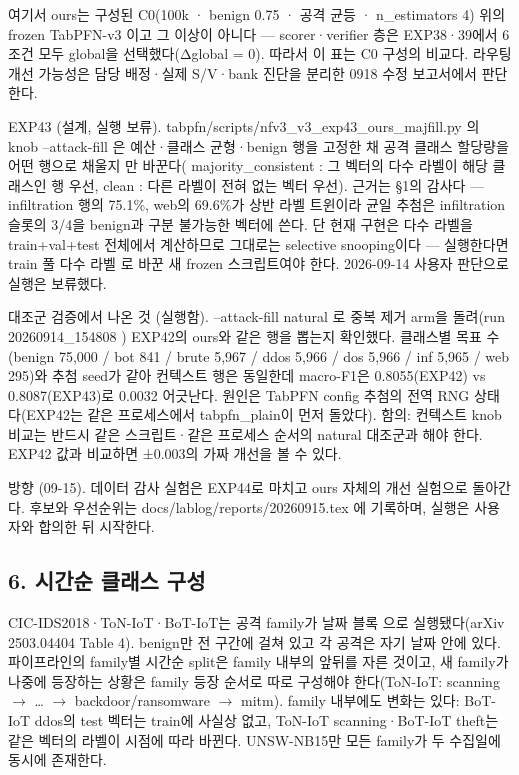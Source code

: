 여기서 ours는 구성된 C0(100k · benign 0.75 · 공격 균등 · n\_\allowbreak{}estimators 4) 위의 frozen TabPFN-v3 이고 그 이상이 아니다 — scorer·verifier 층은 EXP38·39에서 6조건 모두 global을 선택했다(Δglobal =\allowbreak{} 0). 따라서 이 표는 C0 구성의 비교다. 라우팅 개선 가능성은 담당 배정·실제 S/\allowbreak{}V·bank 진단을 분리한 0918 수정 보고서에서 판단한다.

EXP43 (설계, 실행 보류). tabpfn/\allowbreak{}scripts/\allowbreak{}nfv3\_\allowbreak{}v3\_\allowbreak{}exp43\_\allowbreak{}ours\_\allowbreak{}majfill.py 의 knob --attack-fill 은 예산·클래스 균형·benign 행을 고정한 채 공격 클래스 할당량을 어떤 행으로 채울지 만 바꾼다( majority\_\allowbreak{}consistent : 그 벡터의 다수 라벨이 해당 클래스인 행 우선, clean : 다른 라벨이 전혀 없는 벡터 우선). 근거는 §1의 감사다 — infiltration 행의 75.1\%, web의 69.6\%가 상반 라벨 트윈이라 균일 추첨은 infiltration 슬롯의 3/\allowbreak{}4을 benign과 구분 불가능한 벡터에 쓴다. 단 현재 구현은 다수 라벨을 train+\allowbreak{}val+\allowbreak{}test 전체에서 계산하므로 그대로는 selective snooping이다 — 실행한다면 train 풀 다수 라벨 로 바꾼 새 frozen 스크립트여야 한다. 2026-09-14 사용자 판단으로 실행은 보류했다.

대조군 검증에서 나온 것 (실행함). --attack-fill natural 로 중복 제거 arm을 돌려(run 20260914\_\allowbreak{}154808 ) EXP42의 ours와 같은 행을 뽑는지 확인했다. 클래스별 목표 수(benign 75,000 /\allowbreak{} bot 841 /\allowbreak{} brute 5,967 /\allowbreak{} ddos 5,966 /\allowbreak{} dos 5,966 /\allowbreak{} inf 5,965 /\allowbreak{} web 295)와 추첨 seed가 같아 컨텍스트 행은 동일한데 macro-F1은 0.8055(EXP42) vs 0.8087(EXP43)로 0.0032 어긋난다. 원인은 TabPFN config 추첨의 전역 RNG 상태다(EXP42는 같은 프로세스에서 tabpfn\_\allowbreak{}plain이 먼저 돌았다). 함의: 컨텍스트 knob 비교는 반드시 같은 스크립트·같은 프로세스 순서의 natural 대조군과 해야 한다. EXP42 값과 비교하면 ±0.003의 가짜 개선을 볼 수 있다.

방향 (09-15). 데이터 감사 실험은 EXP44로 마치고 ours 자체의 개선 실험으로 돌아간다. 후보와 우선순위는 docs/\allowbreak{}lablog/\allowbreak{}reports/\allowbreak{}20260915.tex 에 기록하며, 실행은 사용자와 합의한 뒤 시작한다.

\subsection*{6. 시간순 클래스 구성}
CIC-IDS2018·ToN-IoT·BoT-IoT는 공격 family가 날짜 블록 으로 실행됐다(arXiv 2503.04404 Table 4). benign만 전 구간에 걸쳐 있고 각 공격은 자기 날짜 안에 있다. 파이프라인의 family별 시간순 split은 family 내부의 앞뒤를 자른 것이고, 새 family가 나중에 등장하는 상황은 family 등장 순서로 따로 구성해야 한다(ToN-IoT: scanning  \ensuremath{\rightarrow}  …  \ensuremath{\rightarrow}  backdoor/\allowbreak{}ransomware  \ensuremath{\rightarrow}  mitm). family 내부에도 변화는 있다: BoT-IoT ddos의 test 벡터는 train에 사실상 없고, ToN-IoT scanning·BoT-IoT theft는 같은 벡터의 라벨이 시점에 따라 바뀐다. UNSW-NB15만 모든 family가 두 수집일에 동시에 존재한다.

